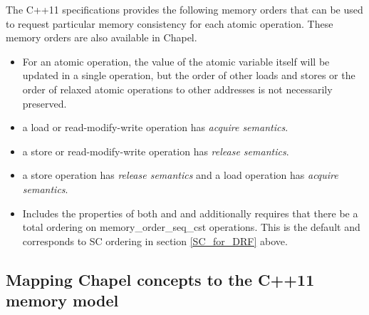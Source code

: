 The C++11 specifications provides the following memory orders that can be used to request particular memory consistency
for each atomic operation. These memory orders are also available in
Chapel.
\begin{itemize}
  \item {} For an atomic operation, the value of the
  atomic variable itself will be updated in a single operation, but the order
  of other loads and stores or the order of relaxed atomic operations to other
  addresses is not necessarily preserved.

  \item {} a load or read-modify-write operation has \textit{acquire
  semantics}.

  \item {} a store or read-modify-write operation has \textit{release
  semantics}.

  \item {} a store operation has \textit{release
  semantics} and a load operation has \textit{acquire semantics}.

  \item {} Includes the properties of both
   and  and
  additionally requires that there be a total ordering on
  memory\_order\_seq\_cst operations. This is the default and corresponds
  to SC ordering in section \ref{SC_for_DRF} above.

\end{itemize}

\subsection{Mapping Chapel concepts to the C++11 memory model}


